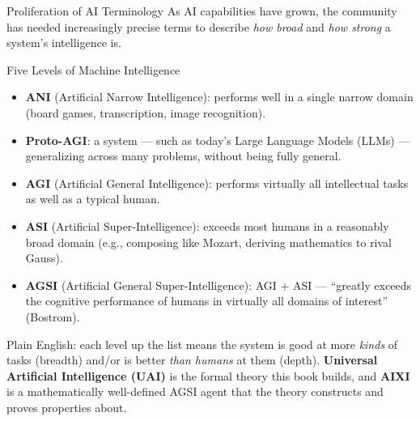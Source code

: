 \documentclass[aspectratio=169,10pt]{beamer}
\begin{document}
\begin{frame}{Proliferation of AI Terminology}
  \small
  As AI capabilities have grown, the community has needed increasingly
  precise terms to describe \emph{how broad} and \emph{how strong} a
  system's intelligence is.

  \begin{block}{Five Levels of Machine Intelligence}
    \begin{itemize}\itemsep1pt
      \item \textbf{ANI} (Artificial Narrow Intelligence): performs well in a
        single narrow domain (board games, transcription, image
        recognition).
      \item \textbf{Proto-AGI}: a system --- such as today's Large Language
        Models (LLMs) --- generalizing across many problems, without being
        fully general.
      \item \textbf{AGI} (Artificial General Intelligence): performs
        virtually all intellectual tasks as well as a typical human.
      \item \textbf{ASI} (Artificial Super-Intelligence): exceeds most
        humans in a reasonably broad domain (e.g., composing like Mozart,
        deriving mathematics to rival Gauss).
      \item \textbf{AGSI} (Artificial General Super-Intelligence): AGI $+$
        ASI --- ``greatly exceeds the cognitive performance of humans in
        virtually all domains of interest'' (Bostrom).
    \end{itemize}
  \end{block}
  Plain English: each level up the list means the system is good at more
  \emph{kinds} of tasks (breadth) and/or is better \emph{than humans} at them
  (depth). \textbf{Universal Artificial Intelligence (UAI)} is the formal
  theory this book builds, and \textbf{AIXI} is a mathematically
  well-defined AGSI agent that the theory constructs and proves properties
  about.
\end{frame}
\end{document}
